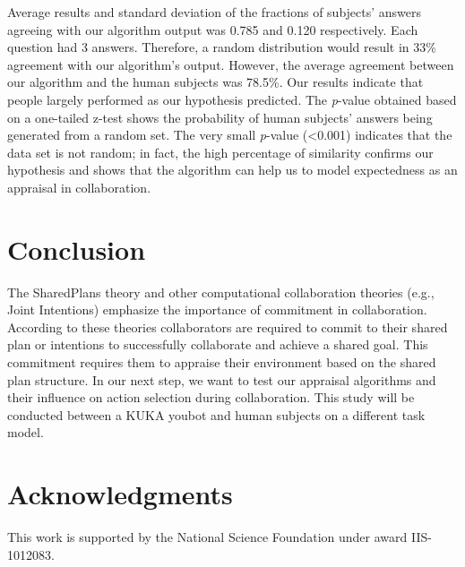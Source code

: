 \documentclass{aamas2016_extendedabstract}
\begin{document}
Average results and standard deviation of the fractions of subjects' answers
agreeing with our algorithm output was 0.785 and 0.120 respectively. Each
question had 3 answers. Therefore, a random distribution would result in 33\%
agreement with our algorithm's output. However, the average agreement between
our algorithm and the human subjects was 78.5\%. Our results indicate that
people largely performed as our hypothesis predicted. The \textit{p}-value
obtained based on a one-tailed z-test shows the probability of human subjects'
answers being generated from a random set. The very small \textit{p}-value
(<0.001) indicates that the data set is not random; in fact, the high percentage
of similarity confirms our hypothesis and shows that the algorithm can help us
to model expectedness as an appraisal in collaboration.

\section{Conclusion}
The SharedPlans theory and other computational collaboration theories (e.g.,
Joint Intentions) emphasize the importance of commitment in collaboration.
According to these theories collaborators are required to commit to their shared
plan or intentions to successfully collaborate and achieve a shared goal. This
commitment requires them to appraise their environment based on the shared plan
structure. In our next step, we want to test our appraisal algorithms and their
influence on action selection during collaboration. This study will be conducted
between a KUKA youbot and human subjects on a different task model.

\section*{Acknowledgments}

{\fontsize{8.2}{9}\selectfont This work is supported by the National Science
Foundation under award IIS-1012083.}



\end{document}
